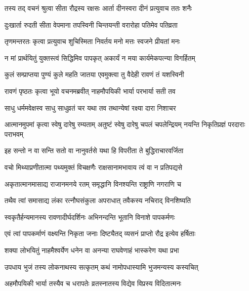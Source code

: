 
\twolineshloka
{तस्य तद् वचनं श्रुत्वा सीता रौद्रस्य रक्षसः}
{आर्ता दीनस्वरा दीनं प्रत्युवाच ततः शनैः} %

\twolineshloka
{दुःखार्ता रुदती सीता वेपमाना तपस्विनी}
{चिन्तयन्ती वरारोहा पतिमेव पतिव्रता} %

\twolineshloka
{तृणमन्तरतः कृत्वा प्रत्युवाच शुचिस्मिता}
{निवर्तय मनो मत्तः स्वजने प्रीयतां मनः} %

\twolineshloka
{न मां प्रार्थयितुं युक्तस्त्वं सिद्धिमिव पापकृत्}
{अकार्यं न मया कार्यमेकपत्न्या विगर्हितम्} %

\twolineshloka
{कुलं सम्प्राप्तया पुण्यं कुले महति जातया}
{एवमुक्त्वा तु वैदेही रावणं तं यशस्विनी} %

\twolineshloka
{रावणं पृष्ठतः कृत्वा भूयो वचनमब्रवीत्}
{नाहमौपयिकी भार्या परभार्या सती तव} %

\twolineshloka
{साधु धर्ममवेक्षस्व साधु साधुव्रतं चर}
{यथा तव तथान्येषां रक्ष्या दारा निशाचर} %

\threelineshloka
{आत्मानमुपमां कृत्वा स्वेषु दारेषु रम्यताम्}
{अतुष्टं स्वेषु दारेषु चपलं चपलेन्द्रियम्}
{नयन्ति निकृतिप्रज्ञं परदाराः पराभवम्} %

\twolineshloka
{इह सन्तो न वा सन्ति सतो वा नानुवर्तसे}
{यथा हि विपरीता ते बुद्धिराचारवर्जिता} %

\twolineshloka
{वचो मिथ्याप्रणीतात्मा पथ्यमुक्तं विचक्षणैः}
{राक्षसानामभावाय त्वं वा न प्रतिपद्यसे} %

\twolineshloka
{अकृतात्मानमासाद्य राजानमनये रतम्}
{समृद्धानि विनश्यन्ति राष्ट्राणि नगराणि च} %

\twolineshloka
{तथैव त्वां समासाद्य लंका रत्नौघसंकुला}
{अपराधात् तवैकस्य नचिराद् विनशिष्यति} %

\twolineshloka
{स्वकृतैर्हन्यमानस्य रावणादीर्घदर्शिनः}
{अभिनन्दन्ति भूतानि विनाशे पापकर्मणः} %

\twolineshloka
{एवं त्वां पापकर्माणं वक्ष्यन्ति निकृता जनाः}
{दिष्ट्यैतद् व्यसनं प्राप्तो रौद्र इत्येव हर्षिताः} %

\twolineshloka
{शक्या लोभयितुं नाहमैश्वर्येण धनेन वा}
{अनन्या राघवेणाहं भास्करेण यथा प्रभा} %

\twolineshloka
{उपधाय भुजं तस्य लोकनाथस्य सत्कृतम्}
{कथं नामोपधास्यामि भुजमन्यस्य कस्यचित्} %

\twolineshloka
{अहमौपयिकी भार्या तस्यैव च धरापतेः}
{व्रतस्नातस्य विद्येव विप्रस्य विदितात्मनः} %

